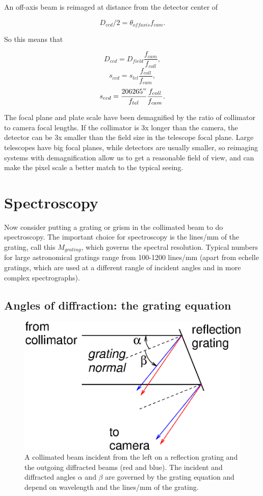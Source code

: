 \documentclass[12pt]{article}
\begin{document}
An off-axis beam is reimaged at distance from the detector center of 

$$ D_{ccd}/2 = \theta_{offaxis} f_{cam}. $$

So this means that

$$ D_{ccd} = D_{field} \frac{f_{cam}}{f_{coll}}, $$
$$ s_{ccd} = s_{tel} \frac{f_{coll}}{f_{cam}}, $$ 
$$ s_{ccd} = \frac{206265"}{f_{tel}} \frac{f_{coll}}{f_{cam}}. $$ 

The focal plane and plate scale have been demagnified by the 
ratio of collimator to camera focal lengths.  If the collimator
is 3x longer than the camera, the detector can be 3x smaller
than the field size in the telescope focal plane.
Large telescopes have big focal planes, while detectors are 
usually smaller, so reimaging systems with demagnification 
allow us to get a reasonable field of view, and can
make the pixel scale a better match to the typical seeing.


\section{Spectroscopy}

Now consider putting a grating or grism in the collimated
beam to do spectroscopy.  The important choice for spectroscopy
is the lines/mm of the grating, call this $M_{grating}$, which 
governs the spectral resolution.  Typical numbers 
for large astronomical gratings range from 100-1200 lines/mm
(apart from echelle gratings, which are used at a different 
rangle of incident angles and in more complex spectrographs).

\subsection{Angles of diffraction: the grating equation}

\begin{figure}[ht]
\centerline{
\includegraphics[width=4.5truein]{grating1.eps}
}
\caption{A collimated beam incident from the left 
on a reflection grating
and the outgoing diffracted beams (red and blue).
The incident and diffracted angles $\alpha$ and $\beta$ are
governed by the grating equation and depend on wavelength
and the lines/mm of the grating.
}
\label{fig-grating}
\end{figure}
\end{document}
